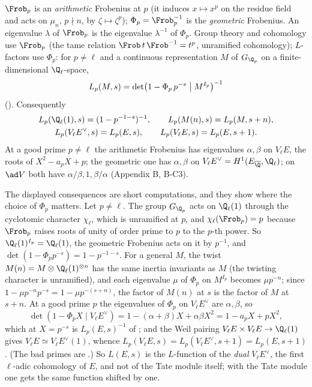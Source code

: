 \begin{convention}\label{conv:lfunctions:frobenius}
$\Frob_p$ is an \emph{arithmetic} Frobenius at $p$ (it induces $x\mapsto x^p$ on the residue field and acts on $\mu_n$, $p\nmid n$, by $\zeta\mapsto\zeta^p$); $\Phi_p=\Frob_p^{-1}$ is the
\emph{geometric} Frobenius. An eigenvalue $\lambda$ of $\Frob_p$ is the eigenvalue $\lambda^{-1}$ of $\Phi_p$. Group theory and cohomology use $\Frob_p$ (the tame relation
$\Frob\,t\,\Frob^{-1}=t^p$, unramified cohomology); $L$-factors use $\Phi_p$: for $p\ne\ell$ and a continuous representation $M$ of $G_{\Q_p}$ on a finite-dimensional
$\Q_\ell$-space,
\[
L_p(M,s)=\det\bigl(1-\Phi_p\,p^{-s}\bigm|M^{I_p}\bigr)^{-1}
\]
(). Consequently
\begin{gather*}
L_p(\Q_\ell(1),s)=(1-p^{-1-s})^{-1},\qquad L_p(M(n),s)=L_p(M,s+n),\\
L_p(V_\ell E^\vee,s)=L_p(E,s),\qquad L_p(V_\ell E,s)=L_p(E,s+1).
\end{gather*}
At a good prime $p\ne\ell$ the arithmetic Frobenius has eigenvalues $\alpha,\beta$ on $V_\ell E$, the roots of $X^2-a_pX+p$; the geometric one has $\alpha,\beta$ on
$V_\ell E^\vee=H^1(E_{\overline\Q},\Q_\ell)$; on $\ad V$ both have $\alpha/\beta,1,\beta/\alpha$ (Appendix B, B-C3).
\end{convention}

The displayed consequences are short computations, and they show where the choice of $\Phi_p$ matters. Let $p\ne\ell$. The group $G_{\Q_p}$ acts on
$\Q_\ell(1)$ through the cyclotomic character $\chi_\ell$, which is unramified at $p$, and $\chi_\ell(\Frob_p)=p$ because $\Frob_p$ raises roots of unity of order prime to $p$ to
the $p$-th power. So $\Q_\ell(1)^{I_p}=\Q_\ell(1)$, the geometric Frobenius acts on it by $p^{-1}$, and $\det(1-\Phi_pp^{-s})=1-p^{-1-s}$. For a general $M$, the twist
$M(n)=M\otimes\Q_\ell(1)^{\otimes n}$ has the same inertia invariants as $M$ (the twisting character is unramified), and each eigenvalue $\mu$ of $\Phi_p$ on $M^{I_p}$ becomes
$\mu p^{-n}$; since $1-\mu p^{-n}p^{-s}=1-\mu p^{-(s+n)}$, the factor of $M(n)$ at $s$ is the factor of $M$ at $s+n$. At a good prime $p$ the eigenvalues of $\Phi_p$ on $V_\ell E^\vee$
are $\alpha,\beta$, so
\[
\det(1-\Phi_pX\mid V_\ell E^\vee)=1-(\alpha+\beta)X+\alpha\beta X^2=1-a_pX+pX^2,
\]
which at $X=p^{-s}$ is $L_p(E,s)^{-1}$ of ; and the Weil pairing $V_\ell E\times V_\ell E\to\Q_\ell(1)$ gives $V_\ell E\simeq V_\ell E^\vee(1)$, whence
$L_p(V_\ell E,s)=L_p(V_\ell E^\vee,s+1)=L_p(E,s+1)$. (The bad primes are .) So $L(E,s)$ is the $L$-function of the \emph{dual} $V_\ell E^\vee$, the
first $\ell$-adic cohomology of $E$, and not of the Tate module itself; with the Tate module one gets the same function shifted by one.

